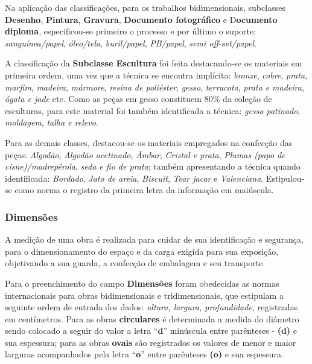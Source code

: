 Na aplicação das classificações, para os trabalhos bidimensionais, subclasses \textbf{Desenho}, \textbf{Pintura}, \textbf{Gravura}, \textbf{Documento fotográfico} e D\textbf{ocumento diploma}, especificou-se primeiro o processo e por último o suporte: \textit{sanguínea/papel}, \textit{óleo/tela}, \textit{buril/papel}, \textit{PB/papel}, \textit{semi off-set/papel}.

A classificação da \textbf{Subclasse Escultura} foi feita destacando-se os materiais em primeira ordem, uma vez que a técnica se encontra implícita: \textit{bronze}, \textit{cobre}, \textit{prata}, \textit{marfim}, \textit{madeira}, \textit{mármore}, \textit{resina de poliéster}, \textit{gesso}, \textit{terracota}, \textit{prata e madeira}, \textit{ágata e jade} etc. Como as peças em gesso constituem 80\% da coleção de esculturas, para este material foi também identificada a técnica: \textit{gesso patinado}, \textit{moldagem}, \textit{talha e relevo}.

Para as demais classes, destacou-se os materiais empregados na confecção das peças: \textit{Algodão}, \textit{Algodão acetinado}, \textit{Âmbar}, \textit{Cristal e prata}, \textit{Plumas (papo de cisne)/madrepérola}, \textit{seda e fio de prata}; também apresentando a técnica quando identificada: \textit{Bordado}, \textit{Jato de areia}, \textit{Biscuit}, \textit{Tear jacar} e \textit{Valenciana}. Estipulou-se como norma o registro da primeira letra da informação em maiúscula.

\subsubsection{Dimensões}
A medição de uma obra é realizada para cuidar de sua identificação e
segurança, para o dimensionamento do espaço e da carga exigida para sua exposição, objetivando a sua guarda, a confecção de embalagem e seu transporte.

Para o preenchimento do campo \textbf{Dimensões} foram obedecidas as normas internacionais para obras bidimensionais e tridimensionais, que estipulam a seguinte ordem de entrada dos dados: 
\textit{altura, largura, profundidade,} registradas em centímetros. Para as obras \textbf{circulares} é determinada a medida do diâmetro sendo colocado a seguir do valor a letra ``\textbf{d}'' minúscula entre parênteses - \textbf{(d)} e sua espessura; para as obras \textbf{ovais} são registrados os valores de menor e maior larguras acompanhados pela letra ``\textbf{o}'' entre parênteses \textbf{(o)} e sua espessura.

